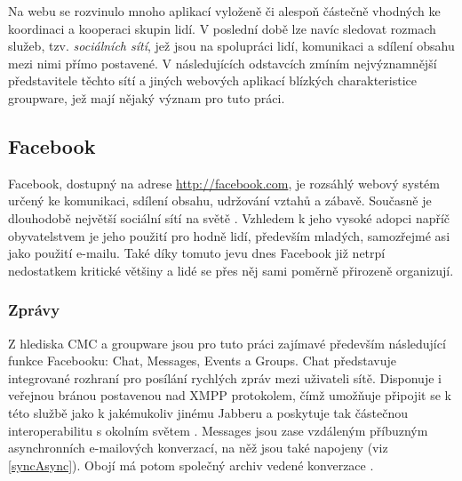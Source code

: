 \documentclass[12pt,oneside,final]{fithesis2}
\begin{document}
Na webu se rozvinulo mnoho aplikací vyloženě či alespoň částečně vhodných ke koordinaci a kooperaci skupin lidí. V poslední době lze navíc sledovat rozmach služeb, tzv. {\it sociálních sítí}, jež jsou na spolupráci lidí, komunikaci a sdílení obsahu mezi nimi přímo postavené. V následujících odstavcích zmíním nejvýznamnější představitele těchto sítí a jiných webových aplikací blízkých charakteristice groupware, jež mají nějaký význam pro tuto práci.

\subsection{Facebook}\label{facebook}
Facebook, dostupný na adrese \url{http://facebook.com}, je rozsáhlý webový systém určený ke komunikaci, sdílení obsahu, udržování vztahů a zábavě. Současně je dlouhodobě největší sociální sítí na světě \cite{kazeniac2009social} \cite{protalinski2012facebook}. Vzhledem k jeho vysoké adopci napříč obyvatelstvem \cite{docekal2011socialni} je jeho použití pro hodně lidí, především mladých, samozřejmé asi jako použití e-mailu. Také díky tomuto jevu dnes Facebook již netrpí nedostatkem kritické většiny a lidé se přes něj sami poměrně přirozeně organizují.

\subsubsection*{Zprávy}
Z hlediska CMC a groupware jsou pro tuto práci zajímavé především následující funkce Facebooku: Chat, Messages, Events a Groups. Chat představuje integrované rozhraní pro posílání rychlých zpráv mezi uživateli sítě. Disponuje i veřejnou bránou postavenou nad XMPP protokolem, čímž umožňuje připojit se k této službě jako k jakémukoliv jinému Jabberu a poskytuje tak částečnou interoperabilitu s okolním světem \cite{reiss2010facebook}. Messages jsou zase vzdáleným příbuzným asynchronních e-mailových konverzací, na něž jsou také napojeny (viz \ref{syncAsync}). Obojí má potom společný archiv vedené konverzace \cite{seligstein2010see}.
\end{document}
